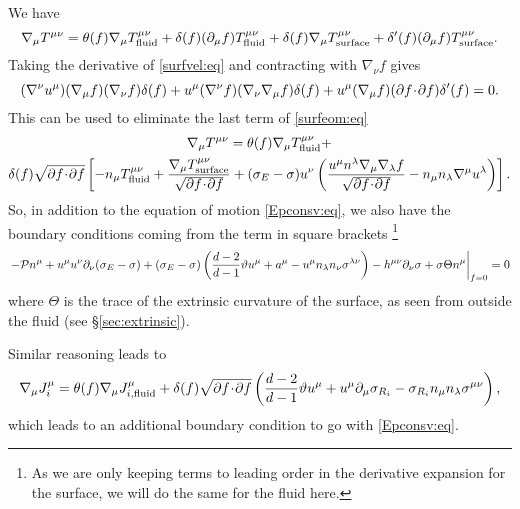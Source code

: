 \documentclass[12pt]{article}
\newcommand{\ploc}{\mathcal{P}}
\begin{document}
We have
%
\begin{equation}\label{surfeom:eq}
  \nabla_\mu T^{\mu\nu} = \theta(f)\nabla_\mu T^{\mu\nu}_\text{fluid} + \delta(f)(\partial_\mu f) T^{\mu\nu}_\text{fluid} + \delta(f)\nabla_\mu T^{\mu\nu}_\text{surface} + \delta'(f)(\partial_\mu f) T^{\mu\nu}_\text{surface}.
\end{equation}
%
Taking the derivative of \eqref{surfvel:eq} and contracting with $\nabla_\nu f$ gives
%
\begin{equation*}
  (\nabla^\nu u^\mu) (\nabla_\mu f) (\nabla_\nu f) \delta(f)
  + u^\mu (\nabla^\nu f) (\nabla_\nu \nabla_\mu f) \delta(f)
  + u^\mu (\nabla_\mu f) (\partial f \!\cdot\! \partial f) \delta'(f)
  = 0.
\end{equation*}
%
This can be used to eliminate the last term of \eqref{surfeom:eq}
%
\begin{multline}\label{surfeom2:eq}
  \nabla_\mu T^{\mu\nu} = \theta(f)\nabla_\mu T^{\mu\nu}_\text{fluid} +\\ \delta(f)\sqrt{\partial f \!\cdot\! \partial f}\left [ 
  -n_\mu T^{\mu\nu}_\text{fluid} + \frac{\nabla_\mu T^{\mu\nu}_\text{surface}}{\sqrt{\partial f \!\cdot\! \partial f}}
  +(\sigma_E-\sigma)u^\nu\left ( \frac{u^\mu n^\lambda \nabla_\mu\nabla_\lambda f}{\sqrt{\partial f \!\cdot\! \partial f}} - n_\mu n_\lambda \nabla^\mu u^\lambda \right )
   \right ].
\end{multline}
%
So, in addition to the equation of motion \eqref{Epconsv:eq}, we also have the boundary conditions coming from the term in square brackets
\footnote{As we are only keeping terms to leading order in the derivative expansion for the surface, we will do the same for the fluid here.}
%
\begin{equation}\label{surfbc:eq}
  \left.
  -\ploc n^\mu + u^\mu u^\nu \p_\nu (\sigma_E-\sigma)
  +(\sigma_E-\sigma)\prn{ \frac{d-2}{d-1}\vartheta u^\mu  + a^\mu - u^\mu n_\lambda n_\nu \sigma^{\lambda\nu}}
  -h^{\mu\nu}\p_\nu\sigma + \sigma\Theta n^\mu
  \right\vert_{f=0} = 0
\end{equation}
%
where $\Theta$ is the trace of the extrinsic curvature of the surface, as seen from outside the fluid (see \S\ref{sec:extrinsic}).

Similar reasoning leads to
%
\begin{equation}\label{surfchbc:eq}
  \nabla_\mu J^\mu_i= \theta(f)\nabla_\mu J^\mu_{i,\text{fluid}}
   + \delta(f)\sqrt{\partial f \!\cdot\! \partial f} \left ( \frac{d-2}{d-1}\vartheta u^\mu + u^\mu\partial_\mu\sigma_{R_i} - \sigma_{R_i}n_\mu n_\lambda \sigma^{\mu\nu} \right ),
\end{equation}
%
which leads to an additional boundary condition to go with \eqref{Epconsv:eq}.
\end{document}
